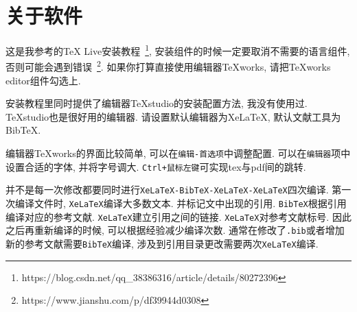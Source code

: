 \chapter{关于软件}
这是我参考的TeX Live安装教程~\footnote{https://blog.csdn.net/qq\_38386316/article/details/80272396}, 安装组件的时候一定要取消不需要的语言组件, 否则可能会遇到错误~\footnote{https://www.jianshu.com/p/df39944d0308}. 如果你打算直接使用编辑器TeXworks, 请把TeXworks editor组件勾选上. 

安装教程里同时提供了编辑器TeXstudio的安装配置方法, 我没有使用过. TeXstudio也是很好用的编辑器. 请设置默认编辑器为XeLaTeX, 默认文献工具为BibTeX.

编辑器TeXworks的界面比较简单, 可以在{\tt 编辑-首选项}中调整配置. 可以在{\tt 编辑器}项中设置合适的字体, 并将字号调大. {\tt Ctrl+鼠标左键}可实现tex与pdf间的跳转.

并不是每一次修改都要同时进行{\tt XeLaTeX-BibTeX-XeLaTeX-XeLaTeX}四次编译. 第一次编译文件时, {\tt XeLaTeX}编译大多数文本. 并标记文中出现的引用. {\tt BibTeX}根据引用编译对应的参考文献. {\tt XeLaTeX}建立引用之间的链接. {\tt XeLaTeX}对参考文献标号. 因此之后再重新编译的时候, 可以根据经验减少编译次数. 通常在修改了{\tt .bib}或者增加新的参考文献需要{\tt BibTeX}编译, 涉及到引用目录更改需要两次{\tt XeLaTeX}编译.

